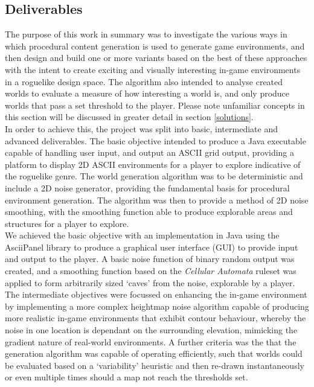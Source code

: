 \documentclass[12pt,a4paper]{article}
\begin{document}
\subsection{Deliverables}

The purpose of this work in summary was to investigate the various ways in which procedural content generation is used to generate game environments, and then design and build one or more variants based on the best of these approaches with the intent to create exciting and visually interesting in-game environments in a roguelike design space. The algorithm also intended to analyse created worlds to evaluate a measure of how interesting a world is, and only produce worlds that pass a set threshold to the player. Please note unfamiliar concepts in this section will be discussed in greater detail in section \ref{solutions}.\\

In order to achieve this, the project was split into basic, intermediate and advanced deliverables. The basic objective intended to produce a Java executable capable of handling user input, and output an ASCII grid output, providing a platform to display 2D ASCII environments for a player to explore indicative of the roguelike genre. The world generation algorithm was to be deterministic and include a 2D noise generator, providing the fundamental basis for procedural environment generation. The algorithm was then to provide a method of 2D noise smoothing, with the smoothing function able to produce explorable areas and structures for a player to explore. \\

We achieved the basic objective with an implementation in Java using the AsciiPanel library to produce a graphical user interface (GUI) to provide input and output to the player. A basic noise function of binary random output was created, and a smoothing function based on the \emph{Cellular Automata} ruleset was applied to form arbitrarily sized `caves' from the noise, explorable by a player.\\

The intermediate objectives were focussed on enhancing the in-game environment by implementing a more complex heightmap noise algorithm capable of producing more realistic in-game environments that exhibit contour behaviour, whereby the noise in one location is dependant on the surrounding elevation, mimicking the gradient nature of real-world environments. A further criteria was the that the generation algorithm was capable of operating efficiently, such that worlds could be evaluated based on a `variability' heuristic and then re-drawn instantaneously or even multiple times should a map not reach the thresholds set.\\
\end{document}
